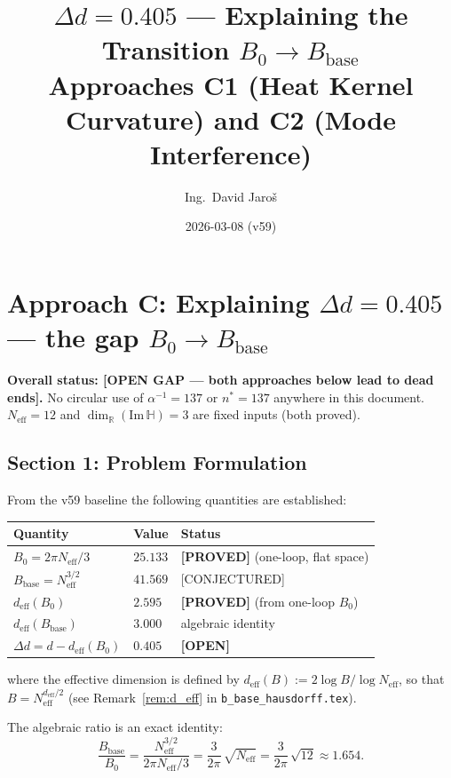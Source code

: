 \documentclass[11pt,a4paper]{article}
\title{$\Delta d = 0.405$ — Explaining the Transition $B_0 \to B_{\mathrm{base}}$\\
    \large Approaches C1 (Heat Kernel Curvature) and C2 (Mode Interference)}
\author{Ing.\ David Jaroš}
\date{2026-03-08 (v59)}
\theoremstyle{definition}
\theoremstyle{remark}
\begin{document}
  \maketitle
\fi

\section{Approach C: Explaining $\Delta d = 0.405$ — the gap $B_0 \to B_{\mathrm{base}}$}
\label{sec:delta_d_main}

\textbf{Overall status: [OPEN GAP — both approaches below lead to dead ends].}
No circular use of $\alpha^{-1} = 137$ or $n^* = 137$ anywhere in this document.
$N_{\mathrm{eff}} = 12$ and $\dim_\mathbb{R}(\mathrm{Im}\,\mathbb{H}) = 3$ are fixed inputs (both proved).

\subsection{Section 1: Problem Formulation}
\label{sec:formulation}

From the v59 baseline the following quantities are established:

\begin{center}
\begin{tabular}{lll}
  \hline
  Quantity & Value & Status \\
  \hline
  $B_0 = 2\pi N_{\mathrm{eff}}/3$ & $25.133$ & \textbf{[PROVED]} (one-loop, flat space) \\
  $B_{\mathrm{base}} = N_{\mathrm{eff}}^{3/2}$ & $41.569$ & [CONJECTURED] \\
  $d_{\mathrm{eff}}(B_0)$ & $2.595$ & \textbf{[PROVED]} (from one-loop $B_0$) \\
  $d_{\mathrm{eff}}(B_{\mathrm{base}})$ & $3.000$ & algebraic identity \\
  $\Delta d = d - d_{\mathrm{eff}}(B_0)$ & $0.405$ & \textbf{[OPEN]} \\
  \hline
\end{tabular}
\end{center}

where the effective dimension is defined by
$d_{\mathrm{eff}}(B) := 2\log B / \log N_{\mathrm{eff}}$,
so that $B = N_{\mathrm{eff}}^{d_{\mathrm{eff}}/2}$
(see Remark~\ref{rem:d_eff} in \texttt{b\_base\_hausdorff.tex}).

The algebraic ratio is an exact identity:
\begin{equation}
  \frac{B_{\mathrm{base}}}{B_0}
    = \frac{N_{\mathrm{eff}}^{3/2}}{2\pi N_{\mathrm{eff}}/3}
    = \frac{3}{2\pi}\,\sqrt{N_{\mathrm{eff}}}
    = \frac{3}{2\pi}\,\sqrt{12}
    \approx 1.654.
  \label{eq:ratio_identity}
\end{equation}
\end{document}

